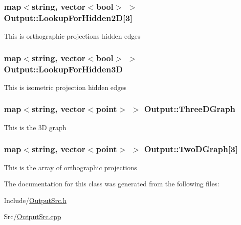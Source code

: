 \subsubsection[{\texorpdfstring{Lookup\+For\+Hidden2D}{LookupForHidden2D}}]{\setlength{\rightskip}{0pt plus 5cm}map$<$string, vector$<$bool$>$ $>$ Output\+::\+Lookup\+For\+Hidden2D\mbox{[}3\mbox{]}}\hypertarget{classOutput_a09326f8ecea28b8fafce2903753d508f}{}\label{classOutput_a09326f8ecea28b8fafce2903753d508f}
This is orthographic projections hidden edges 
\subsubsection[{\texorpdfstring{Lookup\+For\+Hidden3D}{LookupForHidden3D}}]{\setlength{\rightskip}{0pt plus 5cm}map$<$string, vector$<$bool$>$ $>$ Output\+::\+Lookup\+For\+Hidden3D}\hypertarget{classOutput_a0efdf7e2ffdd5375d925c1d41784e365}{}\label{classOutput_a0efdf7e2ffdd5375d925c1d41784e365}
This is isometric projection hidden edges 
\subsubsection[{\texorpdfstring{Three\+D\+Graph}{ThreeDGraph}}]{\setlength{\rightskip}{0pt plus 5cm}map$<$string, vector$<${\bf point}$>$ $>$ Output\+::\+Three\+D\+Graph}\hypertarget{classOutput_aae5a299ccc1830950c8e03cfe7863a4f}{}\label{classOutput_aae5a299ccc1830950c8e03cfe7863a4f}
This is the 3D graph 
\subsubsection[{\texorpdfstring{Two\+D\+Graph}{TwoDGraph}}]{\setlength{\rightskip}{0pt plus 5cm}map$<$string, vector$<${\bf point}$>$ $>$ Output\+::\+Two\+D\+Graph\mbox{[}3\mbox{]}}\hypertarget{classOutput_a24397893b0741447fdc351e5f66c2bfc}{}\label{classOutput_a24397893b0741447fdc351e5f66c2bfc}
This is the array of orthographic projections 

The documentation for this class was generated from the following files\+:\begin{DoxyCompactItemize}
\item 
Include/\hyperlink{OutputSrc_8h}{Output\+Src.\+h}\item 
Src/\hyperlink{OutputSrc_8cpp}{Output\+Src.\+cpp}\end{DoxyCompactItemize}
